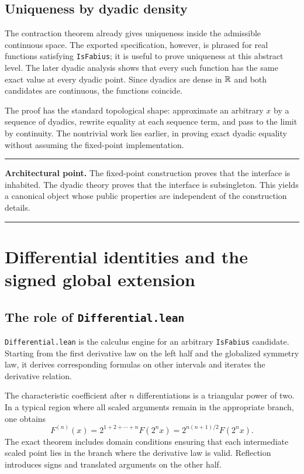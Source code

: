 \documentclass[11pt,oneside]{article}
\theoremstyle{definition}
\theoremstyle{remark}
\newenvironment{boxedremark}{%
  \par\smallskip\noindent\begin{center}\begin{minipage}{0.94\textwidth}%
  \color{black}\hrule\vspace{0.6em}\small
}{%
  \vspace{0.6em}\hrule\end{minipage}\end{center}\smallskip
}
\begin{document}
\subsection{Uniqueness by dyadic density}
The contraction theorem already gives uniqueness inside the admissible continuous space.  The exported specification, however, is phrased for real functions satisfying \nolinkurl{IsFabius}; it is useful to prove uniqueness at this abstract level.  The later dyadic analysis shows that every such function has the same exact value at every dyadic point.  Since dyadics are dense in \(\mathbb{R}\) and both candidates are continuous, the functions coincide.

The proof has the standard topological shape: approximate an arbitrary \(x\) by a sequence of dyadics, rewrite equality at each sequence term, and pass to the limit by continuity.  The nontrivial work lies earlier, in proving exact dyadic equality without assuming the fixed-point implementation.

\begin{boxedremark}\textbf{Architectural point.}\space
The fixed-point construction proves that the interface is inhabited.  The dyadic theory proves that the interface is subsingleton.  This yields a canonical object whose public properties are independent of the construction details.
\end{boxedremark}

\section{Differential identities and the signed global extension}\label{ch:differential}

\subsection{The role of \texttt{Differential.lean}}
\nolinkurl{Differential.lean} is the calculus engine for an arbitrary \nolinkurl{IsFabius} candidate.  Starting from the first derivative law on the left half and the globalized symmetry law, it derives corresponding formulas on other intervals and iterates the derivative relation.

The characteristic coefficient after \(n\) differentiations is a triangular power of two.  In a typical region where all scaled arguments remain in the appropriate branch, one obtains
\[
  F^{(n)}(x)
  =2^{1+2+\cdots+n}F(2^n x)
  =2^{n(n+1)/2}F(2^n x).
\]
The exact theorem includes domain conditions ensuring that each intermediate scaled point lies in the branch where the derivative law is valid.  Reflection introduces signs and translated arguments on the other half.
\end{document}
